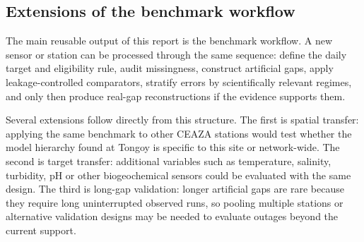 \subsection{Extensions of the benchmark workflow}
\label{sec:future_extensions}

The main reusable output of this report is the benchmark workflow. A new sensor or station can be
processed through the same sequence: define the daily target and eligibility rule, audit missingness,
construct artificial gaps, apply leakage-controlled comparators, stratify errors by scientifically
relevant regimes, and only then produce real-gap reconstructions if the evidence supports them.

Several extensions follow directly from this structure. The first is spatial transfer: applying the
same benchmark to other CEAZA stations would test whether the model hierarchy found at Tongoy is
specific to this site or network-wide. The second is target transfer: additional variables such as
temperature, salinity, turbidity, pH or other biogeochemical sensors could be evaluated with the
same design. The third is long-gap validation: longer artificial gaps are rare because they require
long uninterrupted observed runs, so pooling multiple stations or alternative validation designs
may be needed to evaluate outages beyond the current support.